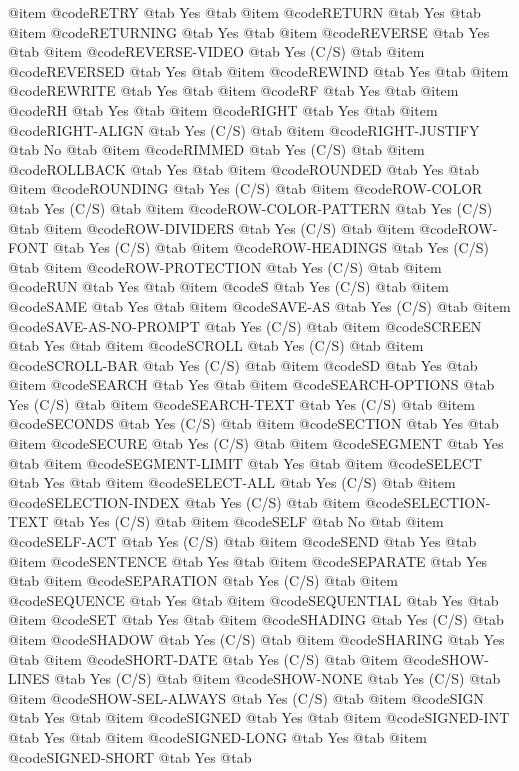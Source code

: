 @item @code{RETRY} @tab Yes @tab 
@item @code{RETURN} @tab Yes @tab 
@item @code{RETURNING} @tab Yes @tab 
@item @code{REVERSE} @tab Yes @tab 
@item @code{REVERSE-VIDEO} @tab Yes	(C/S) @tab 
@item @code{REVERSED} @tab Yes @tab 
@item @code{REWIND} @tab Yes @tab 
@item @code{REWRITE} @tab Yes @tab 
@item @code{RF} @tab Yes @tab 
@item @code{RH} @tab Yes @tab 
@item @code{RIGHT} @tab Yes @tab 
@item @code{RIGHT-ALIGN} @tab Yes	(C/S) @tab 
@item @code{RIGHT-JUSTIFY} @tab No @tab 
@item @code{RIMMED} @tab Yes	(C/S) @tab 
@item @code{ROLLBACK} @tab Yes @tab 
@item @code{ROUNDED} @tab Yes @tab 
@item @code{ROUNDING} @tab Yes	(C/S) @tab 
@item @code{ROW-COLOR} @tab Yes	(C/S) @tab 
@item @code{ROW-COLOR-PATTERN} @tab Yes	(C/S) @tab 
@item @code{ROW-DIVIDERS} @tab Yes	(C/S) @tab 
@item @code{ROW-FONT} @tab Yes	(C/S) @tab 
@item @code{ROW-HEADINGS} @tab Yes	(C/S) @tab 
@item @code{ROW-PROTECTION} @tab Yes	(C/S) @tab 
@item @code{RUN} @tab Yes @tab 
@item @code{S} @tab Yes	(C/S) @tab 
@item @code{SAME} @tab Yes @tab 
@item @code{SAVE-AS} @tab Yes	(C/S) @tab 
@item @code{SAVE-AS-NO-PROMPT} @tab Yes	(C/S) @tab 
@item @code{SCREEN} @tab Yes @tab 
@item @code{SCROLL} @tab Yes	(C/S) @tab 
@item @code{SCROLL-BAR} @tab Yes	(C/S) @tab 
@item @code{SD} @tab Yes @tab 
@item @code{SEARCH} @tab Yes @tab 
@item @code{SEARCH-OPTIONS} @tab Yes	(C/S) @tab 
@item @code{SEARCH-TEXT} @tab Yes	(C/S) @tab 
@item @code{SECONDS} @tab Yes	(C/S) @tab 
@item @code{SECTION} @tab Yes @tab 
@item @code{SECURE} @tab Yes	(C/S) @tab 
@item @code{SEGMENT} @tab Yes @tab 
@item @code{SEGMENT-LIMIT} @tab Yes @tab 
@item @code{SELECT} @tab Yes @tab 
@item @code{SELECT-ALL} @tab Yes	(C/S) @tab 
@item @code{SELECTION-INDEX} @tab Yes	(C/S) @tab 
@item @code{SELECTION-TEXT} @tab Yes	(C/S) @tab 
@item @code{SELF} @tab No @tab 
@item @code{SELF-ACT} @tab Yes	(C/S) @tab 
@item @code{SEND} @tab Yes @tab 
@item @code{SENTENCE} @tab Yes @tab 
@item @code{SEPARATE} @tab Yes @tab 
@item @code{SEPARATION} @tab Yes	(C/S) @tab 
@item @code{SEQUENCE} @tab Yes @tab 
@item @code{SEQUENTIAL} @tab Yes @tab 
@item @code{SET} @tab Yes @tab 
@item @code{SHADING} @tab Yes	(C/S) @tab 
@item @code{SHADOW} @tab Yes	(C/S) @tab 
@item @code{SHARING} @tab Yes @tab 
@item @code{SHORT-DATE} @tab Yes	(C/S) @tab 
@item @code{SHOW-LINES} @tab Yes	(C/S) @tab 
@item @code{SHOW-NONE} @tab Yes	(C/S) @tab 
@item @code{SHOW-SEL-ALWAYS} @tab Yes	(C/S) @tab 
@item @code{SIGN} @tab Yes @tab 
@item @code{SIGNED} @tab Yes @tab 
@item @code{SIGNED-INT} @tab Yes @tab 
@item @code{SIGNED-LONG} @tab Yes @tab 
@item @code{SIGNED-SHORT} @tab Yes @tab 
